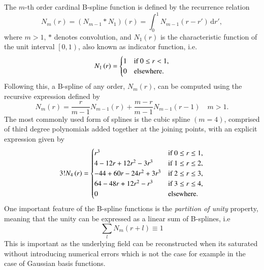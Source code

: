 \documentclass[review,authoryear,3p]{elsarticle}
\begin{document}
The $m$-th  order cardinal B-spline function is defined by the recurrence relation \citep{Chui1992} 
\begin{equation}
N_{m}\left(r\right) = \left(N_{m-1}\ast N_{1}\right)\left(r\right) = \int_0^{1} N_{m-1}\left( r-r'\right)\,\mathrm{d}r',
\label{SplineConvolutionIntegral}
\end{equation}
where $m>1$, $\ast$ denotes convolution, and $N_1\left(r\right)$ is the characteristic function of the unit interval $\left[ 0,1\right)$, also known as indicator function, i.e.
\begin{equation}
N_{1}\left(r\right)=
\begin{cases}
1 & \text{if $ 0\le r<1$}, \\
0 & \mathrm{elsewhere}.
\end{cases}
\end{equation}
Following this, a B-spline of any order, $N_m(r)$, can be computed using the recursive expression defined by \citep{DeBoor2001}
\begin{equation}\label{eq:MRA-DoBoorFormula}
 N_{m}\left(r\right)=\frac{r}{m-1}N_{m-1}\left(r\right)+\frac{m-r}{m-1}N_{m-1}\left(r-1\right) \quad m>1.
 \end{equation}
The most commonly used form of splines is the cubic spline $\left(m=4\right)$, comprised of third degree polynomials added together at the joining points, with an explicit expression given by
\begin{align}
3!N_{4}\left(r\right)=
\begin{cases}
r^3 & \text{if $ 0\le r\le1$}, \\
4-12r+12r^2-3r^3 & \text{if $1\le r\le2$}, \\
-44+60r-24r^2+3r^3 & \text{if $2\le r\le3$}, \\
64-48r+12r^2-r^3 & \text{if $3\le r\le4$}, \\
0 & \mathrm{elsewhere}.
\end{cases}
\end{align}
One important feature of the B-spline functions is the \emph{partition of unity} property, meaning that the unity can be expressed as a linear sum of B-splines, i.e
\begin{equation}
	\sum_{l}N_m(r+l)\equiv1
	\end{equation}
	This is important as the underlying field can be reconstructed when its saturated without introducing numerical errors which is not the case for example in the case of Gaussian basis functions.
	
\end{document}
